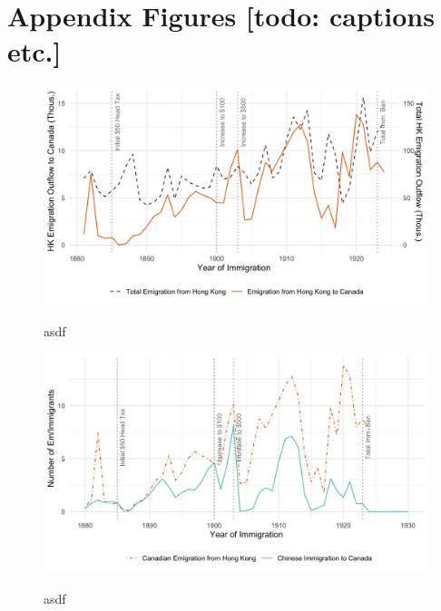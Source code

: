 \documentclass[12pt]{article}
\begin{document}
\newpage



\appendix 
\section{Appendix Figures [todo: captions etc.]}
\begin{figure}
    \centering 
    \caption{asdf}
    \includegraphics[width=\textwidth]{../../figs/fig2_flow_hkemig.png}
    \label{fig:hkemig}
\end{figure}

\begin{figure}
    \centering 
    \caption{asdf}
    \includegraphics[width=\textwidth]{../../figs/fig2_flow_immandem.png}
    \label{fig:hkemig}
\end{figure}
\end{document}
